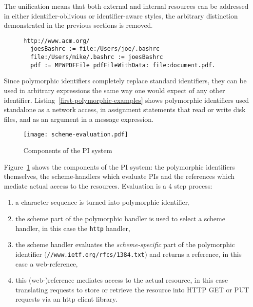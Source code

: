 \documentclass[preprint,authoryear]{acm_proc_article-sp}
\begin{document}
The unification means that both external and internal resources can be addressed in either
identifier-oblivious or identifier-aware styles, the arbitrary distinction demonstrated in
the previous sections is removed.

\begin{figure}[htbp]
\begin{lstlisting}[style=L,label=first-polymorphic-examples,caption=\emph{Polymorphic identifiers} in simple expressions.]
  http://www.acm.org/
  joesBashrc := file:/Users/joe/.bashrc
  file:/Users/mike/.bashrc := joesBashrc
  pdf := MPWPDFFile pdfFileWithData: file:document.pdf.
\end{lstlisting}
\end{figure}

Since polymorphic identifiers completely replace standard identifiers, they can be used
in arbitrary expressions the same way one would expect of any other identifier.  
Listing~\ref{first-polymorphic-examples} shows polymorphic identifiers used 
standalone as a network access, in assignment statements that read or write disk files,
and as an argument in a message expression.

\begin{figure}[htbp]
\label{scheme-eval}
\begin{center}
\texttt{[image: scheme-evaluation.pdf]}
\caption{Components of the PI system}
\end{center}
\end{figure}

Figure~\ref{scheme-eval} shows the components of the PI system:  the polymorphic
identifiers themselves, the scheme-handlers which evaluate PIs and the references
which mediate actual access to the resources.  Evaluation is a 4 step process:

\begin{enumerate}
\item a character sequence is turned into  polymorphic identifier,
\item the scheme part of the polymorphic handler is used to select a scheme handler, in this case the {\tt http} handler,
\item the scheme handler evaluates the {\em scheme-specific} part of the polymorphic identifier ({\tt //www.ietf.org/rfcs/1384.txt})
	 and returns a reference, in this case a web-reference,
\item this (web-)reference mediates access to the actual resource, in this case translating requests to store or retrieve the 
	resource into HTTP GET or PUT requests via an http client library.
\end{enumerate}
\end{document}
